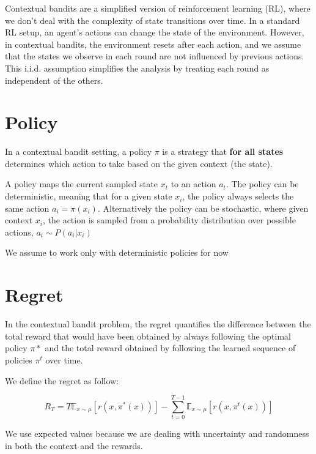 \begin{warningbox}[Warning]
    Contextual bandits are a simplified version of reinforcement learning (RL), where we don't deal with the complexity of state transitions over time. In a standard RL setup, an agent’s actions can change the state of the environment. However, in contextual bandits, the environment resets after each action, and we assume that the states we observe in each round are not influenced by previous actions. This i.i.d. assumption simplifies the analysis by treating each round as independent of the others.
\end{warningbox}

\section{Policy}

In a contextual bandit setting, a policy $\pi$ is a strategy that \textbf{for all states} determines which action to take based on the given context (the state).

A policy maps the current sampled state $x_t$ to an action $a_t$. The policy can be deterministic, meaning that for a given state $x_i$, the policy always selects the same action $a_i = \pi(x_i)$. Alternatively the policy can be stochastic, where given context $x_i$, the action is sampled from a probability distribution over possible actions, $a_i \sim P(a_i | x_i)$

\begin{warningbox}[Warning]
    We assume to work only with deterministic policies for now
\end{warningbox}

\section{Regret}
In the contextual bandit problem, the regret quantifies the difference between the total reward that would have been obtained by always following the optimal policy $\pi*$ and the total reward obtained by following the learned sequence of policies $\pi^t$ over time.

We define the regret as follow:

$$
    R_T = T \mathbb{E}_{x \sim \mu} [r(x, \pi^*(x))] - \sum_{t=0}^{T-1} \mathbb{E}_{x \sim \mu} [r(x, \pi^t(x))]
$$

\begin{tipbox}[Explanation]
    We use expected values because we are dealing with uncertainty and randomness in both the context and the rewards.
\end{tipbox}


